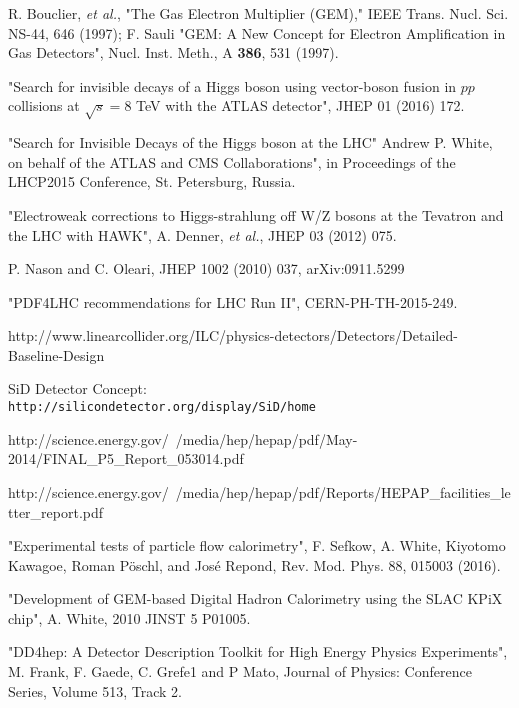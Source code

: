  R. Bouclier, {\it et al.}, "The Gas Electron Multiplier (GEM),"
  IEEE Trans. Nucl. Sci. NS-44, 646 (1997);  F. Sauli "GEM: A New Concept
  for Electron Amplification in Gas Detectors", Nucl. Inst. Meth., A
  {\bf 386}, 531 (1997).
  
 "Search for invisible decays of a Higgs boson using vector-boson fusion 
  in $pp$ collisions at $\sqrt{s}=8$ TeV with the ATLAS detector",  JHEP 01 (2016) 172.
  
 "Search for Invisible Decays of the Higgs boson at the LHC"
   Andrew P. White, on behalf of the ATLAS and CMS Collaborations", in Proceedings of the
   LHCP2015 Conference, St. Petersburg, Russia.
   
 "Electroweak corrections to Higgs-strahlung off W/Z bosons at the Tevatron and the LHC with HAWK",
   A. Denner, {\it et al.}, JHEP 03  (2012) 075.
   
 P. Nason and C. Oleari, JHEP 1002 (2010) 037, arXiv:0911.5299

 "PDF4LHC recommendations for LHC Run II", CERN-PH-TH-2015-249.

 http://www.linearcollider.org/ILC/physics-detectors/Detectors/Detailed-Baseline-Design

 {SiD Detector Concept: \\
  \tt http://silicondetector.org/display/SiD/home}
  
 http://science.energy.gov/~/media/hep/hepap/pdf/May-2014/FINAL_P5_Report_053014.pdf

 http://science.energy.gov/~/media/hep/hepap/pdf/Reports/HEPAP_facilities_letter_report.pdf

 "Experimental tests of particle flow calorimetry", F. Sefkow, A. White, Kiyotomo Kawagoe, Roman Pöschl, 
  and José Repond, Rev. Mod. Phys. 88, 015003 (2016).
  
 "Development of GEM-based Digital Hadron Calorimetry using the SLAC KPiX chip", A. White, 2010 JINST 5 P01005.

 "DD4hep: A Detector Description Toolkit for High Energy Physics Experiments", M. Frank, F. Gaede, C. Grefe1 and P Mato, 
  Journal of Physics: Conference Series, Volume 513, Track 2.
  

